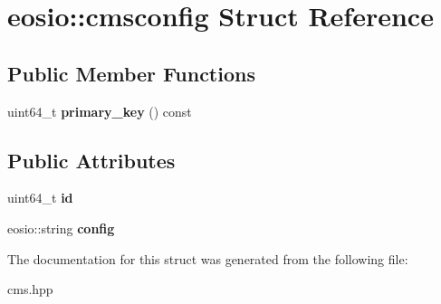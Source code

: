 \hypertarget{structeosio_1_1cmsconfig}{}\section{eosio\+:\+:cmsconfig Struct Reference}
\label{structeosio_1_1cmsconfig}
\subsection*{Public Member Functions}
\begin{DoxyCompactItemize}
\item 
\mbox{\label{structeosio_1_1cmsconfig_a2a6fc70d36e677aee1a170851b4915a9}} 
uint64\+\_\+t {\bfseries primary\+\_\+key} () const
\end{DoxyCompactItemize}
\subsection*{Public Attributes}
\begin{DoxyCompactItemize}
\item 
\mbox{\label{structeosio_1_1cmsconfig_ac04c5db51b880970500c5b44db03a39d}} 
uint64\+\_\+t {\bfseries id}
\item 
\mbox{\label{structeosio_1_1cmsconfig_a0c7c2e7be6aced2e83a1a40b5f1d1c3b}} 
eosio\+::string {\bfseries config}
\end{DoxyCompactItemize}


The documentation for this struct was generated from the following file\+:\begin{DoxyCompactItemize}
\item 
cms.\+hpp\end{DoxyCompactItemize}
